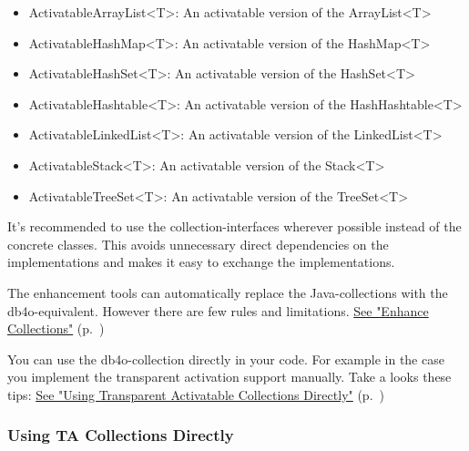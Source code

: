 \begin{itemize}
\item ActivatableArrayList\textless{}T\textgreater{}: An activatable version of the ArrayList\textless{}T\textgreater{}
\item ActivatableHashMap\textless{}T\textgreater{}: An activatable version of the HashMap\textless{}T\textgreater{}
\item ActivatableHashSet\textless{}T\textgreater{}: An activatable version of the HashSet\textless{}T\textgreater{}
\item ActivatableHashtable\textless{}T\textgreater{}: An activatable version of the HashHashtable\textless{}T\textgreater{}
\item ActivatableLinkedList\textless{}T\textgreater{}: An activatable version of the LinkedList\textless{}T\textgreater{}
\item ActivatableStack\textless{}T\textgreater{}: An activatable version of the Stack\textless{}T\textgreater{}
\item ActivatableTreeSet\textless{}T\textgreater{}: An activatable version of the TreeSet\textless{}T\textgreater{}
\end{itemize}

It's recommended to use the collection-interfaces wherever possible instead of the concrete classes. This avoids unnecessary direct dependencies on the implementations and makes it easy to exchange the implementations.

The enhancement tools can automatically replace the Java-collections with the db4o-equivalent. However there are few rules and limitations. \hyperref[ref:basics-transparentpersistence-collections-enhance-collections]{See "Enhance Collections"} (p.~\pageref{ref:basics-transparentpersistence-collections-enhance-collections})

You can use the db4o-collection directly in your code. For example in the case you implement the transparent activation support manually. Take a looks these tips: \hyperref[ref:basics-transparentpersistence-collections-use-ta-collections]{See "Using Transparent Activatable Collections Directly"} (p.~\pageref{ref:basics-transparentpersistence-collections-use-ta-collections})

\subsubsection{Using TA Collections Directly}
\label{ref:basics-transparentpersistence-collections-use-ta-collections}

